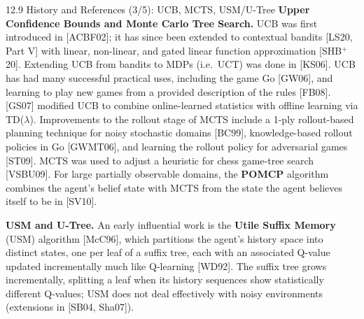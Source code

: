 \documentclass[aspectratio=169,10pt]{beamer}
\begin{document}
\begin{frame}{12.9 History and References (3/5): UCB, MCTS, USM/U-Tree}
\textbf{Upper Confidence Bounds and Monte Carlo Tree Search.} UCB was first introduced in
[ACBF02]; it has since been extended to contextual bandits [LS20, Part V] with linear,
non-linear, and gated linear function approximation [SHB$^+$20]. Extending UCB from
bandits to MDPs (i.e.\ UCT) was done in [KS06]. UCB has had many successful practical uses,
including the game Go [GW06], and learning to play new games from a provided description
of the rules [FB08]. [GS07] modified UCB to combine online-learned statistics with offline
learning via TD($\lambda$). Improvements to the rollout stage of MCTS include a 1-ply
rollout-based planning technique for noisy stochastic domains [BC99], knowledge-based
rollout policies in Go [GWMT06], and learning the rollout policy for adversarial games
[ST09]. MCTS was used to adjust a heuristic for chess game-tree search [VSBU09]. For large
partially observable domains, the \textbf{POMCP} algorithm combines the agent's belief
state with MCTS from the state the agent believes itself to be in [SV10].

\textbf{USM and U-Tree.} An early influential work is the \textbf{Utile Suffix Memory}
(USM) algorithm [McC96], which partitions the agent's history space into distinct states,
one per leaf of a suffix tree, each with an associated Q-value updated incrementally
much like Q-learning [WD92]. The suffix tree grows incrementally, splitting a leaf when
its history sequences show statistically different Q-values; USM does not deal
effectively with noisy environments (extensions in [SB04, Sha07]).
\end{frame}
\end{document}
